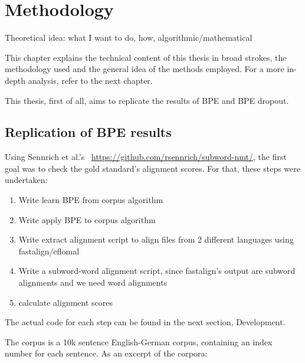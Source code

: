 %
%

\chapter{Methodology}\label{sec:methodology}

Theoretical idea: what I want to do, how, algorithmic/mathematical

This chapter explains the technical content of this thesis in broad strokes, the methodology used and the general idea of the methods employed. For a more in-depth analysis, refer to the next chapter.

This thesis, first of all, aims to replicate the results of BPE and BPE dropout.

\section{Replication of BPE results}

Using Sennrich et al.'s~\cite{sennrich2015neural} \href{code on Github}{https://github.com/rsennrich/subword-nmt/}, the first goal was to check the gold standard's alignment scores. For that, these steps were undertaken:

\begin{enumerate}
	\item Write learn BPE from corpus algorithm
	\item Write apply BPE to corpus algorithm
	\item Write extract alignment script to align files from 2 different languages using fastalign/eflomal
	\item Write a subword-word alignment script, since fastalign's output are subword alignments and we need word alignments
	\item calculate alignment scores
\end{enumerate}

The actual code for each step can be found in the next section, Development.

The corpus is a 10k sentence English-German corpus, containing an index number for each sentence. As an excerpt of the corpora:

